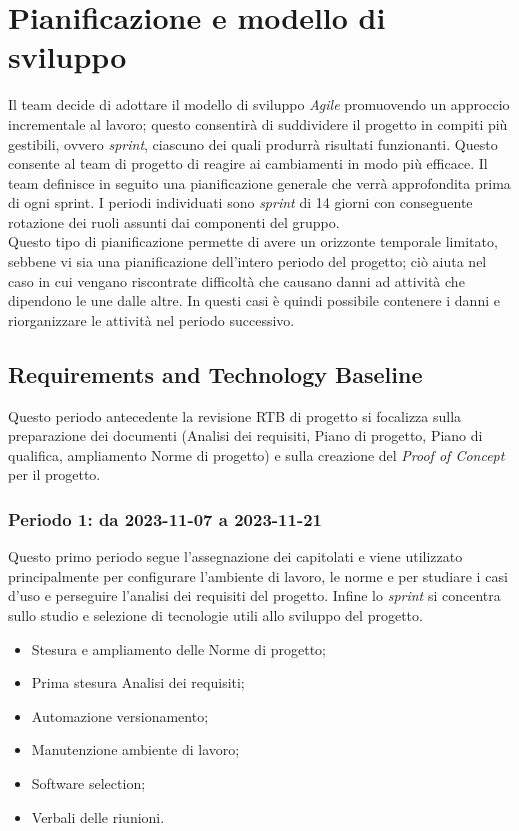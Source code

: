 \documentclass[10pt, a4paper]{article}
\begin{document}
{{{{{{{{%
\section{Pianificazione e modello di sviluppo}
\label{section:Pianificazione}

Il team decide di adottare il modello di sviluppo \textit{Agile} 
promuovendo un approccio incrementale al lavoro; questo consentirà di suddividere il progetto in compiti più gestibili, ovvero \textit{sprint}, ciascuno dei quali produrrà risultati funzionanti. Questo consente al team di progetto di reagire ai cambiamenti in modo più efficace.
Il team definisce in seguito una pianificazione generale che verrà approfondita prima di ogni sprint.
I periodi individuati sono \textit{sprint} di 14 giorni con conseguente rotazione dei ruoli assunti dai componenti del gruppo.\\
Questo tipo di pianificazione permette di avere un orizzonte temporale limitato, sebbene vi sia una pianificazione dell'intero periodo del progetto; ciò aiuta nel caso in cui vengano riscontrate difficoltà che causano danni ad attività che dipendono le une dalle altre. In questi casi è quindi possibile contenere i danni e riorganizzare le attività nel periodo successivo.

\subsection{Requirements and Technology Baseline}
Questo periodo antecedente la revisione RTB di progetto si focalizza sulla preparazione dei documenti (Analisi dei requisiti, Piano di progetto, Piano di qualifica, ampliamento Norme di progetto) e sulla creazione del \textit{Proof of Concept} per il progetto.
\newpage
\subsubsection{Periodo 1: da 2023-11-07 a 2023-11-21}
Questo primo periodo segue l'assegnazione dei capitolati e viene utilizzato principalmente per configurare l'ambiente di lavoro, le norme e per studiare i casi d'uso e perseguire l'analisi dei requisiti del progetto. Infine lo \textit{sprint} si concentra sullo studio e selezione di tecnologie utili allo sviluppo del progetto.
\begin{itemize}
    \item Stesura e ampliamento delle Norme di progetto;
    \item Prima stesura Analisi dei requisiti;
    \item Automazione versionamento;
    \item Manutenzione ambiente di lavoro;
    \item Software selection;
    \item Verbali delle riunioni.
        

\end{itemize}}}}}}}}}
\end{document}
